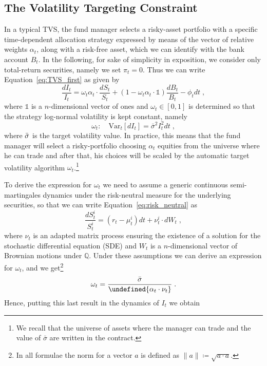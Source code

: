 \documentclass[11pt]{article}
\let\norm\undefined %
\DeclarePairedDelimiter\norm{\lVert}{\rVert}
\begin{document}
\subsection{The Volatility Targeting Constraint}
In a typical TVS, the fund manager selects a risky-asset portfolio with a specific time-dependent allocation strategy expressed by means of the vector of relative weights $\alpha_t$, along with a risk-free asset, which we can identify with the bank account $B_t$. In the following, for sake of simplicity in exposition, we consider only total-return securities, namely we set $\pi_t=0$. Thus we can write Equation~\eqref{eq:TVS_first} as given by
\begin{equation}
    \frac{dI_t}{I_t}= \omega_t \alpha_t \cdot \frac{dS_t}{S_t} + \left(1-\omega_t  \alpha_t \cdot \mathds{1} \right)\frac{dB_t}{B_t}- \phi_t dt \; ,
\label{eq:TVS_elegant}\end{equation}
where $\mathds{1}$ is a $n$-dimensional vector of ones and $\omega_t\in[0,1]$ is determined so that the strategy log-normal volatility is kept constant, namely
\begin{equation}
        \omega_t: \quad \mathrm{Var}_t[dI_t] = \bar{\sigma}^2I_t^2dt \; ,
\end{equation}
where $\Bar{\sigma}$ is the target volatility value.
In practice, this means that the fund manager will select a risky-portfolio choosing $\alpha_t$ equities from the universe where he can trade and after that, his choices will be scaled by the automatic target volatility algorithm $\omega_t$.\footnote{We recall that the universe of assets where the manager can trade and the value of $\bar{\sigma}$ are written in the contract.}

To derive the expression for $\omega_t$ we need to assume a generic continuous semi-martingales dynamics under the risk-neutral measure for the underlying securities, so that we can write Equation~\eqref{eq:risk_neutral} as 
\begin{equation}
    \frac{dS_t^i}{S_t^i} = \left(r_t - \mu_t^i \right)dt + \nu_t^i \cdot dW_t \; ,
\label{eq:Equity_process}\end{equation}
where $\nu_t$ is an adapted matrix process ensuring the existence of a solution for the stochastic differential equation (SDE) and $W_t$ is a $n$-dimensional vector of Brownian motions under $\mathbb{Q}$. Under these assumptions we can derive an expression for $\omega_t$, and we get\footnote{In all formulae the norm for a vector $a$ is defined as $\|a\|\coloneqq\sqrt{a\cdot a}$.}
\begin{equation}
    \omega_t = \frac{\Bar{\sigma}}{\norm{ \alpha_t\cdot \nu_t }} \; .
\end{equation}
Hence, putting this last result in the dynamics of $I_t$ we obtain
\end{document}
